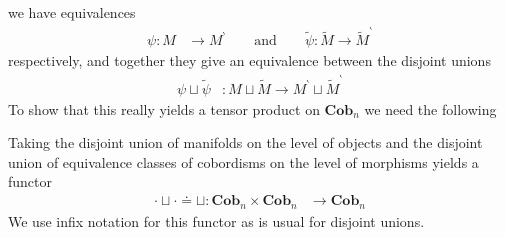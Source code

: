 we have equivalences
\begin{align*}
  \psi
  \colon
  M
  &\to
  M^{\backprime}
  \qquad
  \text{and}
  \qquad
  \tilde{\psi}
  \colon
  \tilde{M}
  \to
  \tilde{M}^{\backprime}
\end{align*}
respectively, and together they give an equivalence between the disjoint unions
\begin{align*}
  \psi
  \sqcup
  \tilde{\psi}
  &\colon
  M
  \sqcup
  \tilde{M}
  \to
  M^{\backprime}
  \sqcup
  \tilde{M}^{\backprime}
\end{align*}
To show that this really yields a tensor product on $\mathbf{Cob}_{n}$ we need the following
\\
\begin{lem}
\label{lem:disunfun}
Taking the disjoint union of manifolds on the level of objects and the disjoint union of equivalence classes of cobordisms on the level of morphisms yields a functor
\begin{align*}
  \cdot
  \sqcup
  \cdot
  \doteq
  \sqcup
  \colon
  \mathbf{Cob}_{n}
  \times
  \mathbf{Cob}_{n}
  &\to
  \mathbf{Cob}_{n}
\end{align*}
We use infix notation for this functor as is usual for disjoint unions.
\end{lem}

